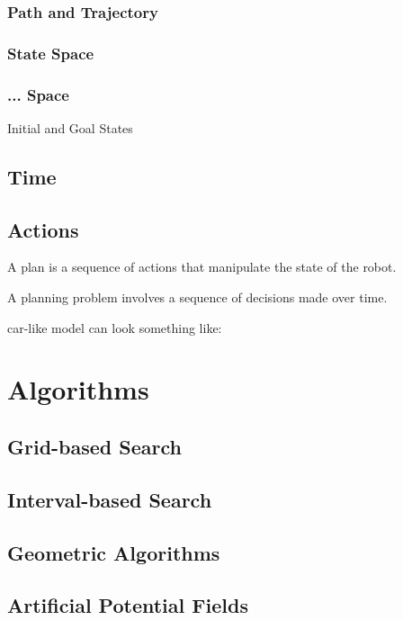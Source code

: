 \subsubsection{Path and Trajectory}

\subsubsection{State Space}

\subsubsection{... Space}

Initial and Goal States

\subsection{Time}
\label{subsec:Time}

\subsection{Actions}
\label{subsec:Actions}

A plan is a sequence of actions that manipulate the state of the robot.

A planning problem involves a sequence of decisions made over time.


car-like model can look something like:

\section{Algorithms}
\subsection{Grid-based Search}
\label{subsec:gridbasedsearch}

\subsection{Interval-based Search}
\label{subsec:intervalbasedsearch}

\subsection{Geometric Algorithms}
\label{subsec:geometricalgorithms}

\subsection{Artificial Potential Fields}
\label{subsec:artificialpotentialfields}

